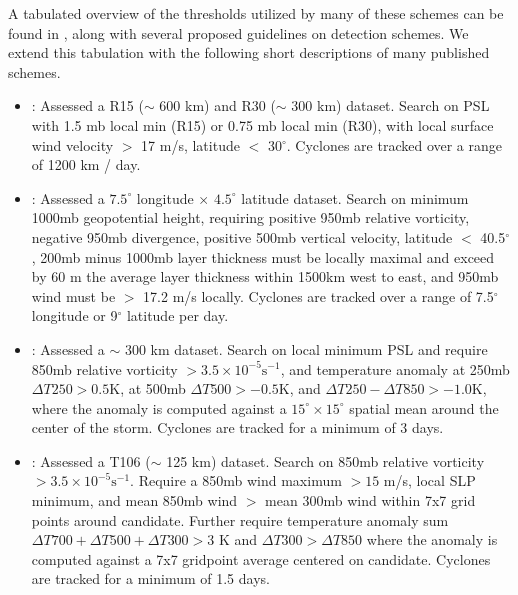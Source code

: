 \documentclass[gmdd, hvmath, online]{copernicus_discussions}
\begin{document}
A tabulated overview of the thresholds utilized by many of these schemes can be found in \cite{walsh2007objectively}, along with several proposed guidelines on detection schemes.  We extend this tabulation with the following short descriptions of many published schemes.

\begin{itemize}
\item \cite{broccoli1990existing}: Assessed a R15 ($\sim$ 600 km) and R30 ($\sim$ 300 km) dataset.  Search on PSL with 1.5 mb local min (R15) or 0.75 mb local min (R30), with local surface wind velocity $>$ 17 m/s, latitude $<$ 30$^\circ$.  Cyclones are tracked over a range of 1200 km / day.

\item \cite{wu1992gcm}: Assessed a $7.5^\circ$ longitude $\times$ $4.5^\circ$ latitude dataset.  Search on minimum 1000mb geopotential height, requiring positive 950mb relative vorticity, negative 950mb divergence, positive 500mb vertical velocity, latitude $<$ 40.5$^\circ$, 200mb minus 1000mb layer thickness must be locally maximal and exceed by 60 m the average layer thickness within 1500km west to east, and 950mb wind must be $>$ 17.2 m/s locally.  Cyclones are tracked over a range of 7.5$^\circ$ longitude or 9$^\circ$ latitude per day.

\item \cite{haarsma1993tropical}: Assessed a $\sim$ 300 km dataset.  Search on local minimum PSL and require 850mb relative vorticity $> 3.5 \times 10^{-5} \mbox{s}^{-1}$, and temperature anomaly at 250mb $\Delta T250 > 0.5 \mbox{K}$, at 500mb $\Delta T500 > -0.5 \mbox{K}$, and $\Delta T250 - \Delta T850 > -1.0 \mbox{K}$, where the anomaly is computed against a $15^\circ \times 15^\circ$ spatial mean around the center of the storm.  Cyclones are tracked for a minimum of 3 days.

\item \cite{bengtsson1995hurricane, bengtsson1996will}:  Assessed a T106 ($\sim$ 125 km) dataset.  Search on 850mb relative vorticity $> 3.5 \times 10^{-5} \mbox{s}^{-1}$.  Require a 850mb wind maximum $> 15$ m/s, local SLP minimum, and mean 850mb wind $>$ mean 300mb wind within 7x7 grid points around candidate.  Further require temperature anomaly sum $\Delta T700+ \Delta T500+ \Delta T300 > 3$ K and $\Delta T300 > \Delta T850$ where the anomaly is computed against a 7x7 gridpoint average centered on candidate.  Cyclones are tracked for a minimum of 1.5 days.


\end{itemize}
\end{document}
